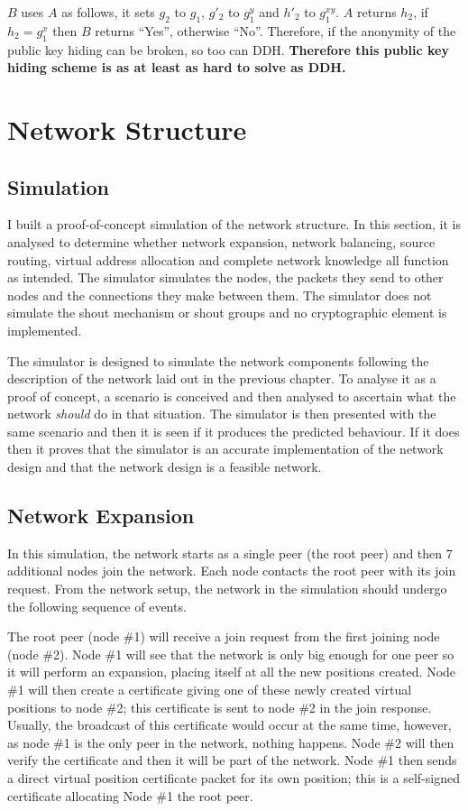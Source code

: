 \documentclass[ %
                    author={Luke Murray},
                supervisor={Dr. Simon Hollis},
                     title={Shadow Peer-to-Peer Networks},
                  subtitle={},
                    degree={MEng},
                      year={2013} ]{thesis}
\begin{document}
$B$ uses $A$ as follows, it sets $g_2$ to $g_1$, $g\prime_2$ to $g_1^{y}$ and $h\prime_2$ to $g_1^{xy}$. $A$ returns $h_2$, if $h_2 = g_1^{x}$ then $B$ returns ``Yes'', otherwise ``No''. Therefore, if the anonymity of the public key hiding can be broken, so too can DDH. \textbf{Therefore this public key hiding scheme is as at least as hard to solve as DDH.}

\section{Network Structure}

\subsection{Simulation}

I built a proof-of-concept simulation of the network structure. In this section, it is analysed to determine whether network expansion, network balancing, source routing, virtual address allocation and complete network knowledge all function as intended. The simulator simulates the nodes, the packets they send to other nodes and the connections they make between them. The simulator does not simulate the shout mechanism or shout groups and no cryptographic element is implemented.

The simulator is designed to simulate the network components following the description of the network laid out in the previous chapter. To analyse it as a proof of concept, a scenario is conceived and then analysed to ascertain what the network {\em should} do in that situation. The simulator is then presented with the same scenario and then it is seen if it produces the predicted behaviour.  If it does then it proves that the simulator is an accurate implementation of the network design and that the network design is a feasible network.

\subsection{Network Expansion}

In this simulation, the network starts as a single peer (the root peer) and then 7 additional nodes join the network. Each node contacts the root peer with its join request. From the network setup, the network in the simulation should undergo the following sequence of events.

The root peer (node \#1) will receive a join request from the first joining node (node \#2). Node \#1 will see that the network is only big enough for one peer so it will perform an expansion, placing itself at all the new positions created. Node \#1 will then create a certificate giving one of these newly created virtual positions to node \#2; this certificate is sent to node \#2 in the join response. Usually, the broadcast of this certificate would occur at the same time, however, as node \#1 is the only peer in the network, nothing happens. Node \#2 will then verify the certificate and then it will be part of the network. Node \#1 then sends a direct virtual position certificate packet for its own position; this is a self-signed certificate allocating Node \#1 the root peer.
\end{document}
